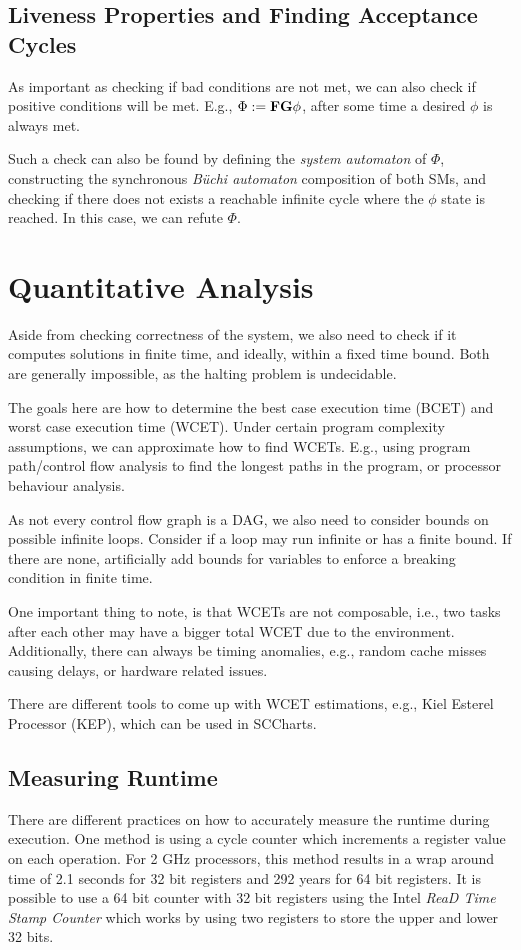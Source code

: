 \subsection{Liveness Properties and Finding Acceptance Cycles}
As important as checking if bad conditions are not met, we can also check if positive conditions will be met.
E.g., \(\Phi := \textbf{F} \textbf{G} \phi\), after some time a desired \(\phi\) is always met.

Such a check can also be found by defining the \emph{system automaton} of \(\Phi\), constructing the synchronous \emph{Büchi automaton} composition of both SMs, and checking if there does not exists a reachable infinite cycle where the \(\phi\) state is reached.
In this case, we can refute \(\Phi\).

\section{Quantitative Analysis}
Aside from checking correctness of the system, we also need to check if it computes solutions in finite time, and ideally, within a fixed time bound.
Both are generally impossible, as the halting problem is undecidable.

The goals here are how to determine the best case execution time (BCET) and worst case execution time (WCET).
Under certain program complexity assumptions, we can approximate how to find WCETs.
E.g., using program path/control flow analysis to find the longest paths in the program, or processor behaviour analysis.

As not every control flow graph is a DAG, we also need to consider bounds on possible infinite loops.
Consider if a loop may run infinite or has a finite bound.
If there are none, artificially add bounds for variables to enforce a breaking condition in finite time.

One important thing to note, is that WCETs are not composable, i.e., two tasks after each other may have a bigger total WCET due to the environment.
Additionally, there can always be timing anomalies, e.g., random cache misses causing delays, or hardware related issues.

There are different tools to come up with WCET estimations, e.g., Kiel Esterel Processor (KEP), which can be used in SCCharts.

\subsection{Measuring Runtime}
There are different practices on how to accurately measure the runtime during execution.
One method is using a cycle counter which increments a register value on each operation.
For 2 GHz processors, this method results in a wrap around time of 2.1 seconds for 32 bit registers and 292 years for 64 bit registers.
It is possible to use a 64 bit counter with 32 bit registers using the Intel \emph{ReaD Time Stamp Counter} which works by using two registers to store the upper and lower 32 bits.

